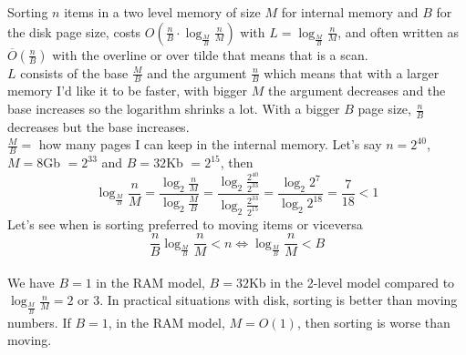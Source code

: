 \documentclass[10pt]{report}
\begin{document}
Sorting $n$ items in a two level memory of size $M$ for internal memory and $B$ for the disk page size, costs $O(\frac{n}{B} \cdot \log_{\frac{M}{B}} \frac{n}{M})$ with $L = \log_{\frac{M}{B}} \frac{n}{M}$, and often written as $\overline{O}(\frac{n}{B})$ with the overline or over tilde that means that is a scan.\\
$L$ consists of the base $\frac{M}{B}$ and the argument $\frac{n}{B}$ which means that with a larger memory I'd like it to be faster, with bigger $M$ the argument decreases and the base increases so the logarithm shrinks a lot. With a bigger $B$ page size, $\frac{n}{B}$ decreases but the base increases.\\
$\frac{M}{B} =$ how many pages I can keep in the internal memory. Let's say $n = 2^{40}$, $M = 8$Gb $= 2^{33}$ and $B = 32$Kb $= 2^{15}$, then $$\log_{\frac{M}{B}} \frac{n}{M} = \frac{\log_2\frac{n}{M}}{\log_2 \frac{M}{B}} = \frac{\log_2 \frac{2^{40}}{2^{33}}}{\log_2 \frac{2^{33}}{2^{15}}} = \frac{\log_2 2^7}{\log_2 2^{18}} = \frac{7}{18} < 1$$
Let's see when is sorting preferred to moving items or viceversa
$$\frac{n}{B} \log_{\frac{M}{B}} \frac{n}{M} < n \Leftrightarrow \log_{\frac{M}{B}} \frac{n}{M} < B$$\\
We have $B = 1$ in the RAM model, $B = 32$Kb in the 2-level model compared to $\log_{\frac{M}{B}}\frac{n}{M} = 2$ or $3$. In practical situations with disk, sorting is better than moving numbers. If $B = 1$, in the RAM model, $M = O(1)$, then sorting is worse than moving.
\end{document}
